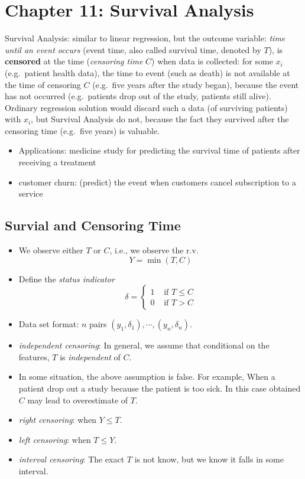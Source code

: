\documentclass[
  letterpaper,
  DIV=11,
  numbers=noendperiod]{scrreprt}
\providecommand{\tightlist}{%
  \setlength{\itemsep}{0pt}\setlength{\parskip}{0pt}}\usepackage{longtable,booktabs,array}
\begin{document}

\chapter{Chapter 11: Survival
Analysis}\label{chapter-11-survival-analysis}

Survival Analysis: similar to linear regression, but the outcome
variable: \emph{time until an event occurs} (event time, also called
survival time, denoted by \(T\)), is \textbf{censored} at the time
(\emph{censoring time} \(C\)) when data is collected: for some \(x_i\)
(e.g.~patient health data), the time to event (such as death) is not
available at the time of censoring \(C\) (e.g.~five years after the
study began), because the event has not occurred (e.g.~patients drop out
of the study, patients still alive). Ordinary regression solution would
discard such a data (of surviving patients) with \(x_i\), but Survival
Analysis do not, because the fact they survived after the censoring time
(e.g.~five years) is valuable.

\begin{itemize}
\tightlist
\item
  Applications: medicine study for predicting the survival time of
  patients after receiving a treatment
\item
  customer churn: (predict) the event when customers cancel subscription
  to a service
\end{itemize}

\section{Survial and Censoring Time}\label{survial-and-censoring-time}

\begin{itemize}
\item
  We observe either \(T\) or \(C\), i.e., we observe the r.v. \[
  Y= \min (T,C)
  \]
\item
  Define the \emph{status indicator} \[
  \delta = \begin{cases}
  1 & \text{ if } T\le C \\
  0 & \text{ if } T > C
  \end{cases}
  \]
\item
  Data set format: \(n\) pairs
  \((y_1,\delta_1), \cdots, (y_n, \delta_n)\).
\item
  \emph{independent censoring}: In general, we assume that conditional
  on the features, \(T\) is \emph{independent} of \(C\).
\item
  In some situation, the above assumption is false. For example, When a
  patient drop out a study because the patient is too sick. In this case
  obtained \(C\) may lead to overestimate of \(T\).
\item
  \emph{right censoring}: when \(Y\le T\).
\item
  \emph{left censoring}: when \(T\le Y\).
\item
  \emph{interval censoring}: The exact \(T\) is not know, but we know it
  falls in some interval.
\end{itemize}
\end{document}
